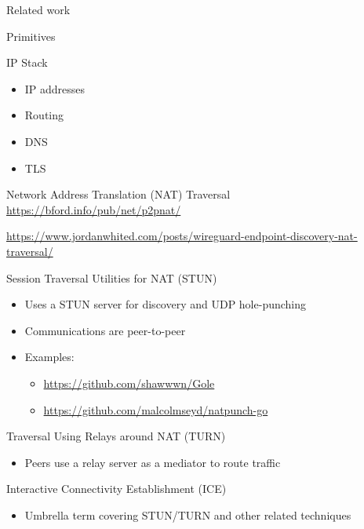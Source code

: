 \begin{frame}[fragile]{Related work}
\begin{block}{Primitives}
\protect\hypertarget{primitives}{}
\begin{block}{IP Stack}
\protect\hypertarget{ip-stack}{}
\begin{itemize}
\tightlist
\item
  IP addresses
\item
  Routing
\item
  DNS
\item
  TLS
\end{itemize}

\begin{block}{Network Address Translation (NAT) Traversal}
\protect\hypertarget{network-address-translation-nat-traversal}{}
\url{https://bford.info/pub/net/p2pnat/}

\url{https://www.jordanwhited.com/posts/wireguard-endpoint-discovery-nat-traversal/}
\end{block}

\begin{block}{Session Traversal Utilities for NAT (STUN)}
\protect\hypertarget{session-traversal-utilities-for-nat-stun}{}
\begin{itemize}
\tightlist
\item
  Uses a STUN server for discovery and UDP hole-punching
\item
  Communications are peer-to-peer
\item
  Examples:

  \begin{itemize}
  \tightlist
  \item
    \url{https://github.com/shawwwn/Gole}
  \item
    \url{https://github.com/malcolmseyd/natpunch-go}
  \end{itemize}
\end{itemize}
\end{block}

\begin{block}{Traversal Using Relays around NAT (TURN)}
\protect\hypertarget{traversal-using-relays-around-nat-turn}{}
\begin{itemize}
\tightlist
\item
  Peers use a relay server as a mediator to route traffic
\end{itemize}
\end{block}

\begin{block}{Interactive Connectivity Establishment (ICE)}
\protect\hypertarget{interactive-connectivity-establishment-ice}{}
\begin{itemize}
\tightlist
\item
  Umbrella term covering STUN/TURN and other related techniques
\end{itemize}
\end{block}


\end{block}
\end{block}
\end{frame}
